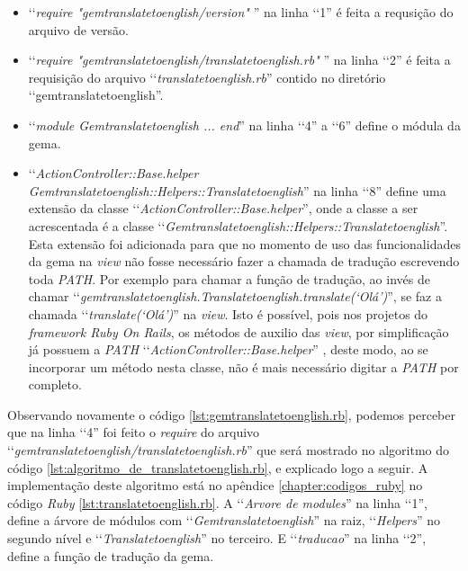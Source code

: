 \begin{itemize}

 \item ‘‘\emph{require "gemtranslatetoenglish/version"} '' na linha ‘‘1'' é feita a requsição do arquivo de
 versão.

 \item ‘‘\emph{require "gemtranslatetoenglish/translatetoenglish.rb"} '' na linha ‘‘2'' é feita a requisição
 do arquivo ‘‘\emph{translatetoenglish.rb}'' contido no diretório ‘‘gemtranslatetoenglish''.

 \item ‘‘\emph{module Gemtranslatetoenglish ... end}'' na linha ‘‘4'' a ‘‘6'' define o módula da gema.

 \item ‘‘\emph{ActionController::Base.helper Gemtranslatetoenglish::Helpers::Translatetoenglish}'' na linha
 ‘‘8'' define uma extensão da classe ‘‘\emph{ActionController::Base.helper}'', onde a classe a ser
 acrescentada é a classe ‘‘\emph{Gemtranslatetoenglish::Helpers::Translatetoenglish}''. Esta extensão foi
 adicionada para que no momento de uso das funcionalidades da gema na \emph{view} não fosse necessário
 fazer a chamada de tradução  escrevendo toda \emph{PATH}. Por exemplo para chamar a função de tradução,
 ao invés de chamar ‘‘\emph{gemtranslatetoenglish.Translatetoenglish.translate(‘Olá’)}'', se faz a chamada
 ‘‘\emph{translate(‘Olá’)}'' na \emph{view}. Isto é possível, pois nos projetos do
 \emph{framework Ruby On Rails}, os métodos de auxilio das \emph{view}, por simplificação já possuem a
 \emph{PATH} ‘‘\emph{ActionController::Base.helper}'' , deste modo, ao se incorporar um método nesta classe,
 não é mais necessário digitar a \emph{PATH} por completo.

\end{itemize}

Observando novamente o código \ref{lst:gemtranslatetoenglish.rb}, podemos perceber que na linha ‘‘4''
foi feito o \emph{require} do arquivo ‘‘\emph{gemtranslatetoenglish/translatetoenglish.rb}'' que
será mostrado no algoritmo do código \ref{lst:algoritmo_de_translatetoenglish.rb}, e explicado logo a seguir. A
implementação deste algoritmo está no apêndice \ref{chapter:codigos_ruby} no código \emph{Ruby}
\ref{lst:translatetoenglish.rb}. A ‘‘\emph{Arvore de modules}'' na linha ‘‘1'', define a árvore de módulos com
‘‘\emph{Gemtranslatetoenglish}'' na raiz, ‘‘\emph{Helpers}'' no segundo nível e ‘‘\emph{Translatetoenglish}''
no terceiro. E ‘‘\emph{traducao}'' na linha ‘‘2'', define a função de tradução da gema.

